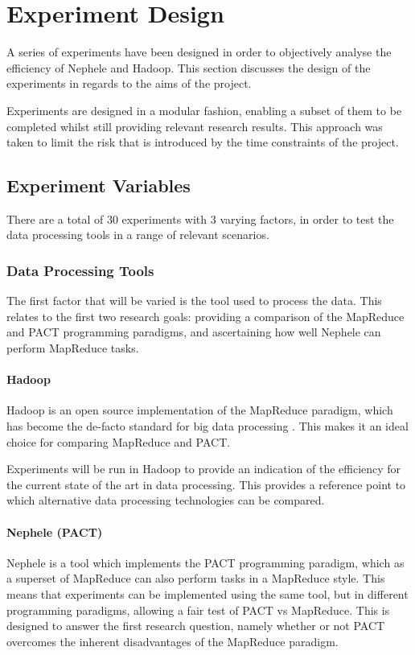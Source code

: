 \chapter{Experiment Design}
A series of experiments have been designed in order to objectively analyse the efficiency of Nephele and Hadoop. This section discusses the design of the experiments in regards to the aims of the project.

Experiments are designed in a modular fashion, enabling a subset of them to be completed whilst still providing relevant research results. This approach was taken to limit the risk that is introduced by the time constraints of the project. 

\section{Experiment Variables}
There are a total of 30 experiments with 3 varying factors, in order to test the data processing tools in a range of relevant scenarios. 

\subsection{Data Processing Tools}
The first factor that will be varied is the tool used to process the data. This relates to the first two research goals: providing a comparison of the MapReduce and PACT programming paradigms, and ascertaining how well Nephele can perform MapReduce tasks.

\subsubsection{Hadoop}
Hadoop is an open source implementation of the MapReduce paradigm, which has become the de-facto standard for big data processing \cite{qin2013reflection}. This makes it an ideal choice for comparing MapReduce and PACT.

Experiments will be run in Hadoop to provide an indication of the efficiency for the current state of the art in data processing. This provides a reference point to which alternative data processing technologies can be compared. 

\subsubsection{Nephele (PACT)}
Nephele is a tool which implements the PACT programming paradigm, which as a superset of MapReduce can also perform tasks in a MapReduce style. This means that experiments can be implemented using the same tool, but in different programming paradigms, allowing a fair test of PACT vs MapReduce. This is designed to answer the first research question, namely whether or not PACT overcomes the inherent disadvantages of the MapReduce paradigm.

